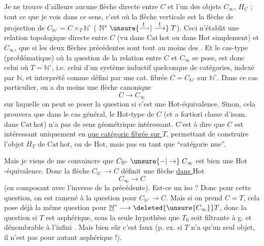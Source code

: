 Je ne trouve d'ailleurs aucune flèche directe entre $C$ et l'un des objets $C_\infty$, $H_C$ ; tout ce que je vois  dans ce sens, c'est
où la flèche verticale est la flèche de projection de $C_{\mathbb N^\circ}=C\times_T\mathbb N^\circ$ ( $\mathbb N^\circ\mathrel{\unsure{\overset{\underline t}{\relbar\joinrel\relbar\mkern-2mu\mapstochar}|\overset{\underline t}{\longrightarrow}}}T$). Ceci n'établit une relation  topologique directe entre $C$ (vu dans $\mathrm{Cat\,hot}$ ou dans $\mathrm{Hot}$ simplement) et $C_\infty$, que si les deux flèches précédentes sont  tout au moins des . Et le cas-type (problématique) où la question de la relation entre $C$ et $C_\infty$ se pose, est donc celui où $T=\mathbb N^\circ$, i.e. celui d'un système inductif quelconque de   catégories, indexé par $\mathbb N$, et interprété comme défini par une cat. fibrée $C=C_{\mathbb N^\circ}$ sur $\mathbb N^\circ$. Dans ce cas particulier, on a du moins une flèche canonique
\[
C\longrightarrow C_\infty
\]
sur laquelle on peut se poser la question si c'est
une $\mathrm{Hot}$-équivalence. Sinon, cela prouvera que dans le cas général, le  $\mathrm{Hot}$-type de $C$ (et a fortiori  classe d'isom. dans $\mathrm{Cat\,hot}$) n'a pas de sens géométrique intéressant.  C'est à dire que $C$ est intéressant uniquement en \uline{ que catégorie fibrée sur $T$}, permettant  de construire l'objet $H_T$ de $\mathrm{Cat\,hot}$, ou de $\mathrm{Hot}$, mais pas en tant que ``catégorie nue''.

Mais je viens de me convaincre que $C_{\mathbb N^\circ}\mathrel{\unsure{-|\to}}C_\infty$ est bien une $\mathrm{Hot}$-équivalence. Donc la flèche $C_{\mathbb N^\circ}\longrightarrow C$ définit une flèche \uline{dans $\mathrm{Hot}$}
\[
C_\infty\longrightarrow C
\]
(en composant avec l'inverse  de la précédente). Est-ce un iso ? Donc pour cette question, on est ramené à la question pour $C_{\mathbb N^\circ}\longrightarrow C$. Mais si on prend $C=T$, cela pose déjà la même question pour $\underline{\mathbb N}^\circ\longrightarrow\deleted{\unsure{C_\infty}}T$, donc la question si $T$ est asphérique, sous la seule hypothèse que $T_0$ soit filtrante à g. et dénombrable à l'infini . Mais bien sûr c'est faux (p. ex. si $T$ n'a qu'un seul objet, il n'est pas pour autant asphérique !).

